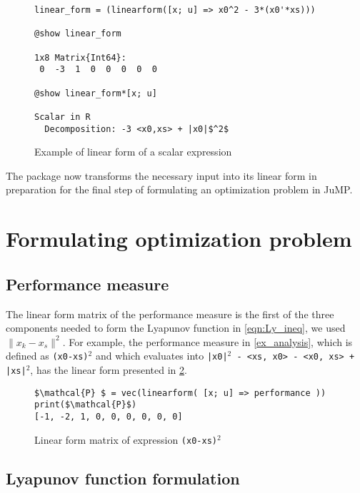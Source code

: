 \begin{figure}[h!]
    \begin{lstlisting}[mathescape] 
linear_form = (linearform([x; u] => x0^2 - 3*(x0'*xs)))

@show linear_form

1x8 Matrix{Int64}:
 0  -3  1  0  0  0  0  0

@show linear_form*[x; u]

Scalar in R
  Decomposition: -3 <x0,xs> + |x0|$^2$
\end{lstlisting}    
\caption{Example of linear form of a scalar expression}
\label{ex_linearform}
\end{figure}

The package now transforms the necessary input into its linear form in preparation for the final step of formulating an optimization problem in JuMP.

\section{Formulating optimization problem}

\subsection*{Performance measure}
The linear form matrix of the performance measure is the first of the three components needed to form the Lyapunov function in \eqref{eqn:Ly_ineq}, we used $\|x_k - x_s\|^2$. For example, the performance measure in \cref{ex_analysis}, which is defined as \texttt{(x0-xs)$^2$} and which evaluates into \texttt{|x0|$^2$ - <xs, x0> - <x0, xs> + |xs|$^2$}, has the linear form presented in \cref{ex_linearform2}.

\begin{figure}[h!]
\begin{lstlisting}[mathescape]
$\mathcal{P} $ = vec(linearform( [x; u] => performance ))
print($\mathcal{P}$)
[-1, -2, 1, 0, 0, 0, 0, 0, 0]
\end{lstlisting}
\caption{Linear form matrix of expression \texttt{(x0-xs)$^2$}}
\label{ex_linearform2}
\end{figure}

\subsection*{Lyapunov function formulation}


